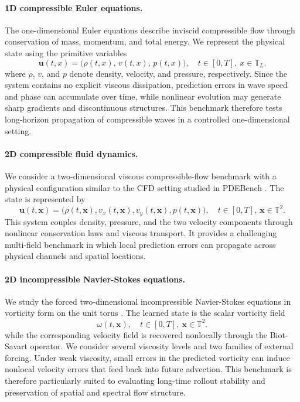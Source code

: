 \documentclass[11pt]{article}
\begin{document}
\paragraph{1D compressible Euler equations.}
The one-dimensional Euler equations describe inviscid compressible flow through conservation of mass, momentum, and total energy. We represent the physical state using the primitive variables
\[
    \mathbf{u}(t,x)
    =
    \bigl(\rho(t,x),\, v(t,x),\, p(t,x)\bigr),\quad t\in[0,T],\ x\in\mathbb{T}_L.
\]
where $\rho$, $v$, and $p$ denote density, velocity, and pressure, respectively. Since the system contains no explicit viscous dissipation, prediction errors in wave speed and phase can accumulate over time, while nonlinear evolution may generate sharp gradients and discontinuous structures. This benchmark therefore tests long-horizon propagation of compressible waves in a controlled one-dimensional setting.
\paragraph{2D compressible fluid dynamics.}
We consider a two-dimensional viscous compressible-flow benchmark with a physical configuration similar to the CFD setting studied in PDEBench \citep{takamoto2022pdebench}. The state is represented by
\[
    \mathbf{u}(t,\mathbf{x})
    =
    \bigl(
        \rho(t,\mathbf{x}),
        v_x(t,\mathbf{x}),
        v_y(t,\mathbf{x}),
        p(t,\mathbf{x})
    \bigr),\quad t\in[0,T],\ \mathbf{x}\in\mathbb{T}^2.
\]
This system couples density, pressure, and the two velocity components through nonlinear conservation laws and viscous transport. It provides a challenging multi-field benchmark in which local prediction errors can propagate across physical channels and spatial locations.

\paragraph{2D incompressible Navier-Stokes equations.}
We study the forced two-dimensional incompressible Navier-Stokes equations in vorticity form on the unit torus \citep{li2022transformer}. The learned state is the scalar vorticity field
\[
    \omega(t,\mathbf{x}),\quad t\in[0,T],\ \mathbf{x}\in\mathbb{T}^2.
\]
while the corresponding velocity field is recovered nonlocally through the Biot-Savart operator. We consider several viscosity levels and two families of external forcing. Under weak viscosity, small errors in the predicted vorticity can induce nonlocal velocity errors that feed back into future advection. This benchmark is therefore particularly suited to evaluating long-time rollout stability and preservation of spatial and spectral flow structure.
\end{document}
